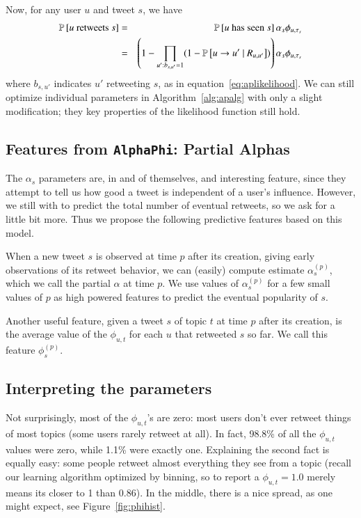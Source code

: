 Now, for any user $u$ and tweet $s$, we have
\begin{eqnarray}
  \mathbb{P} \left[\mbox{$u$ retweets $s$}\right] &=& \mathbb{P} \left[\mbox{$u$ has seen $s$}\right]\alpha_s\phi_{u,\tau_s}\nonumber\\
  &=&\left(1-\prod_{u':b_{s,u'}=1}(1-\mathbb{P} \left[u\to u'~|~R_{u,u'}\right])\right)\alpha_s\phi_{u,\tau_s}\label{eq:apeqfinal}
\end{eqnarray}
where $b_{s,u'}$ indicates $u'$ retweeting $s$, as in equation~\eqref{eq:aplikelihood}.  
We can still optimize individual parameters in Algorithm~\ref{alg:apalg} with only a slight modification; they key properties of the likelihood function still hold.  

\subsection{Features from \texttt{AlphaPhi}: Partial Alphas}

The $\alpha_s$ parameters are, in and of themselves, and interesting feature, since they attempt to tell us how good a tweet is independent of a user's influence.  However, we still with to predict the total number of eventual retweets, so we ask for a little bit more.  
Thus we propose the following predictive features based on this model.     

\label{sec:apfeature}

When a new tweet $s$ is observed at time $p$ after its creation, giving early observations of its retweet behavior, we can (easily) compute estimate $\alpha_s^{(p)}$, which we call the partial $\alpha$ at time $p$. 
We use values of $\alpha_s^{(p)}$ for a few small values of $p$ as high powered features to predict the eventual popularity of $s$.

Another useful feature, given a tweet $s$ of topic $t$ at time $p$ after its creation, is the average value of the $\phi_{u,t}$ for each $u$ that retweeted $s$ so far.
We call this feature $\phi_s^{(p)}$. 

\subsection{Interpreting the parameters}

Not surprisingly, most of the $\phi_{u,t}$'s are zero: most users don't ever retweet things of most topics (some users rarely retweet at all).
In fact, 98.8\% of all the $\phi_{u,t}$ values were zero, while 1.1\% were exactly one.
Explaining the second fact is equally easy: some people retweet almost everything they see from a topic (recall our learning algorithm optimized by binning, so to report a $\phi_{u,t}=1.0$ merely means its closer to 1 than 0.86).  
In the middle, there is a nice spread, as one might expect, see Figure~\ref{fig:phihist}.

